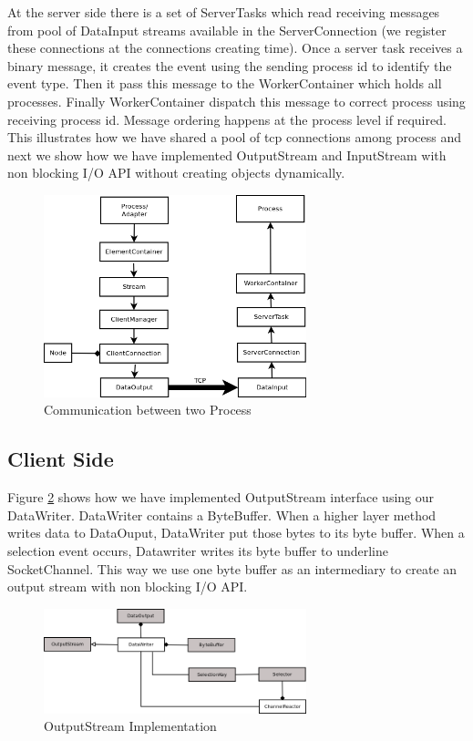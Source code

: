 At the server side there is a set of ServerTasks which read receiving messages from pool of DataInput streams available in the ServerConnection (we register these connections at the connections creating time). Once a server task receives a binary message, it creates the event using the sending process id to identify the event type. Then it pass this message to the WorkerContainer which holds all processes. Finally WorkerContainer dispatch this message to correct process using receiving process id. Message ordering happens at the process level if required. This illustrates how we have shared a pool of tcp connections among process and next we show how we have implemented OutputStream and InputStream with non blocking I/O API without  creating objects dynamically.
\begin{figure}[!tii]
        \centering
        \includegraphics[width=3.0in]{interprocess.png}
        \caption{Communication between two Process}
        \label{interprocess}
\end{figure}
\subsection{Client Side}
Figure \ref{client} shows how we have implemented OutputStream interface using our DataWriter. DataWriter contains a ByteBuffer. When a higher layer method writes data to DataOuput, DataWriter put those bytes to its byte buffer. When a selection event occurs, Datawriter writes its byte buffer to underline SocketChannel. This way we use one byte buffer as an intermediary to create an output stream with non blocking I/O API.
\begin{figure}[!t]
        \centering
        \includegraphics[width=3.0in]{client.png}
        \caption{OutputStream Implementation}
        \label{client}
\end{figure}
